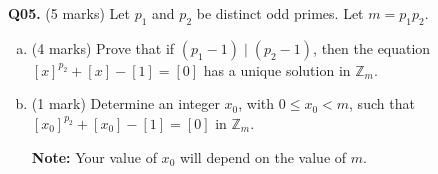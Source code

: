 \documentclass[11pt]{article}
\begin{document}
\textbf{Q05.} (5 marks) Let $p_1$ and $p_2$ be distinct odd primes. Let $m = p_1p_2$.

\begin{enumerate}[(a)]
\item (4 marks) Prove that if $(p_1 - 1) \mid (p_2 - 1)$, then the equation $[x]^{p_2} + [x] - [1] = [0]$ has a unique solution in $\mathbb Z_m$.

\item (1 mark) Determine an integer $x_0$, with $0 \leq x_0 < m$, such that $[x_0]^{p_2} + [x_0] - [1] = [0]$ in $\mathbb Z_m$.

\textbf{Note:} Your value of $x_0$ will depend on the value of $m$.
\end{enumerate}
\end{document}
